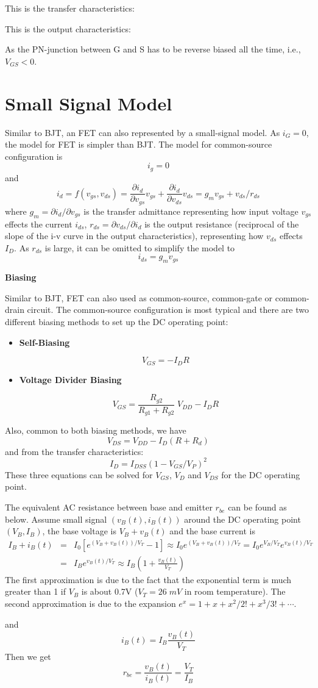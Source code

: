 This is the transfer characteristics:

This is the output characteristics:

As the PN-junction between G and S has to be reverse biased all the time, 
i.e., $V_{GS}<0$. 


\section{Small Signal Model}

Similar to BJT, an FET can also represented by a small-signal model. As
$i_G=0$, the model for FET is simpler than BJT. The model for common-source
configuration is
\[	i_g=0	\]
and
\[	i_d=f(v_{gs}, v_{ds})=\frac{\partial i_d}{\partial v_{gs}} v_{gs}
	+\frac{\partial i_d}{\partial v_{ds}} v_{ds}
	=g_m v_{gs}+v_{ds}/r_{ds}
\]
where $g_m=\partial i_d/\partial v_{gs}$ is the transfer admittance
representing how input voltage $v_{gs}$ effects the current $i_{ds}$,
$r_{ds}=\partial v_{ds}/\partial i_d$ is the output resistance (reciprocal 
of the slope of the i-v curve in the output characteristics), representing
how $v_{ds}$ effects $I_D$. As $r_{ds}$ is large, it can be omitted to 
simplify the model to 
\[	i_{ds}=g_m v_{gs}	\]



{\bf Biasing}

Similar to BJT, FET can also used as common-source, common-gate or
common-drain circuit. The common-source configuration is most typical
and there are two different biasing methods to set up the DC operating
point:
\begin{itemize}
\item {\bf Self-Biasing}

\[	V_{GS}=-I_D R	\]
\item {\bf Voltage Divider Biasing}

\[	V_{GS}=\frac{R_{g2}}{R_{g1}+R_{g2}} \;V_{DD}-I_D R \]
\end{itemize}
Also, common to both biasing methods, we have
\[	V_{DS}=V_{DD}-I_D(R+R_d)	\]
and from the transfer characteristics:
\[	I_D=I_{DSS}(1-V_{GS}/V_P)^2	\]
These three equations can be solved for $V_{GS}$, $V_D$ and $V_{DS}$
for the DC operating point. 


The equivalent AC resistance between base and emitter $r_{be}$ can be found 
as below. Assume small signal $(v_B(t), i_B(t))$ around the DC operating point 
$(V_B, I_B)$, the base voltage is $V_B+v_B(t)$ and the base current is
\begin{eqnarray}
  I_B+i_B(t)&=& I_0 [e^{(V_B+v_B(t))/V_T}-1]\approx I_0 e^{(V_B+v_B(t))/V_T}
  =I_0 e^{V_B/V_T} e^{v_B(t)/V_T}
  \nonumber \\
  &=& I_B e^{v_B(t)/V_T} \approx I_B(1+\frac{v_B(t)}{V_T})
  \nonumber	
\end{eqnarray}
The first approximation is due to the fact that the exponential term is much
greater than 1 if $V_B$ is about 0.7V ($V_T=26\;mV$ in room temperature). The
second approximation is due to the expansion $e^x=1+x+x^2/2!+x^3/3!+\cdots $.

 and 
\[	i_B(t)=I_B \frac{v_B(t)}{V_T}	\]
Then we get
\[	r_{be}=\frac{v_B(t)}{i_B(t)}=\frac{V_T}{I_B}	\]
